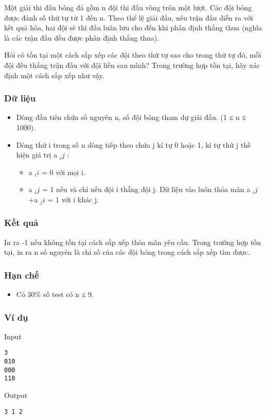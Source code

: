 

Một giải thi đấu bóng đá gồm n đội thi đấu vòng tròn một lượt. Các đội bóng được đánh số thứ tự từ 1 đến n. Theo thể lệ giải đấu, nếu trận đấu diễn ra với kết quả hòa, hai đội sẽ thi đấu luân lưu cho đến khi phân định thắng thua (nghĩa là các trận đấu đều được phân định thắng thua).

Hỏi có tồn tại một cách sắp xếp các đội theo thứ tự sao cho trong thứ tự đó, mỗi đội đều thắng trận đấu với đội liền sau mình? Trong trường hợp tồn tại, hãy xác định một cách sắp xếp như vậy.

\subsubsection{Dữ liệu}
\begin{itemize}
	\item Dòng đầu tiên chứa số nguyên n, số đội bóng tham dự giải đấu. (1 ≤ n ≤ 1000).
	\item Dòng thứ i trong số n dòng tiếp theo chứa j kí tự 0 hoặc 1, kí tự thứ j thế hiện giá trị a $_ ij $ :
\begin{itemize}
	\item a $_ ii $ = 0 với mọi i.
	\item a $_ ij $ = 1 nếu và chỉ nếu đội i thắng đội j. Dữ liệu vào luôn thỏa mãn a $_ ij $ +a $_ ji $ = 1 với i khác j.
\end{itemize}
\end{itemize}

\subsubsection{Kết quả}

In ra -1 nếu không tồn tại cách sắp xếp thỏa mãn yêu cầu. Trong trường hợp tồn tại, in ra n số nguyên là chỉ số của các đội bóng trong cách sắp xếp tìm được.

\subsubsection{Hạn chế}
\begin{itemize}
	\item Có 30\% số test có n ≤ 9.
\end{itemize}

\subsubsection{Ví dụ}

Input
\begin{verbatim}
3
010
000
110\end{verbatim}

Output
\begin{verbatim}
3 1 2\end{verbatim}
